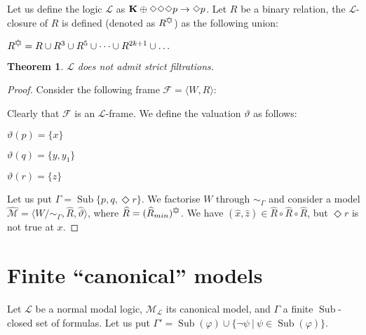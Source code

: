\documentclass[a4paper]{article}
\theoremstyle{defin}
\theoremstyle{theorem}
\newtheorem{theorem}{Theorem}
\theoremstyle{prop}
\theoremstyle{lemma}
\theoremstyle{fact}
\theoremstyle{ex}
\theoremstyle{col}
\theoremstyle{claim}
\begin{document}
Let us define the logic $\mathcal{L}$ as ${\bf K} \oplus \Diamond \Diamond \Diamond p \to \Diamond p$. Let $R$ be a binary relation, the $\mathcal{L}$-closure of $R$ is defined (denoted as $R^{\davidsstar}$) as the following union:
\begin{center}
  $R^{\davidsstar} = R \cup R^3 \cup R^5 \cup \dots \cup R^{2k+1} \cup \dots$
\end{center}

\begin{theorem}
  $\mathcal{L}$ does not admit strict filtrations.
\end{theorem}

\begin{proof}
  Consider the following frame $\mathcal{F} = \langle W, R \rangle$:

\vspace{\baselineskip}


\vspace{\baselineskip}

  Clearly that $\mathcal{F}$ is an $\mathcal{L}$-frame. We define the valuation $\vartheta$ as follows:

  \begin{center}
    $\vartheta(p) = \{ x \}$

    $\vartheta(q) = \{ y, y_1 \}$

    $\vartheta(r) = \{ z \}$
  \end{center}
  Let us put $\Gamma = \operatorname{Sub} \{ p, q, \Diamond r \}$. We factorise $W$ through $\sim_{\Gamma}$ and consider a model $\widehat{\mathcal{M}} = \langle W / \sim_{\Gamma}, \widehat{R}, \widehat{\vartheta} \rangle$, where $\widehat{R} = (\widehat{R}_{min})^{\davidsstar}$.
  We have $(\hat{x}, \hat{z}) \in \widehat{R} \circ \widehat{R} \circ \widehat{R}$, but $\Diamond r$ is not true at $x$.
\end{proof}

\section{Finite ``canonical'' models}

Let $\mathcal{L}$ be a normal modal logic, $\mathcal{M}_{\mathcal{L}}$ its canonical model, and $\Gamma$ a finite $\operatorname{Sub}$-closed set of formulas. Let us put $\Gamma' = \operatorname{Sub}(\varphi) \cup \{ \neg \psi \: | \: \psi \in \operatorname{Sub}(\varphi) \}$.
\end{document}
